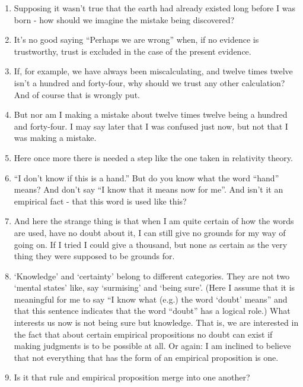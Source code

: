 \documentclass{book}
\begin{document}
\begin{enumerate}
\item
Supposing it wasn't true that the earth had already existed long before I was
born - how should we imagine the mistake being discovered?

\item
It's no good saying ``Perhaps we are wrong'' when, if no evidence is
trustworthy, trust is excluded in the case of the present evidence.

\item
If, for example, we have always been miscalculating, and twelve times twelve
isn't a hundred and forty-four, why should we trust any other calculation? And
of course that is wrongly put.

\item
But nor am I making a mistake about twelve times twelve being a hundred and
forty-four. I may say later that I was confused just now, but not that I was
making a mistake.

\item
Here once more there is needed a step like the one taken in relativity theory.

\item
``I don't know if this is a hand.'' But do you know what the word ``hand''
means? And don't say ``I know that it means now for me''. And isn't it an
empirical fact - that this word is used like this?

\item
And here the strange thing is that when I am quite certain of how the words are
used, have no doubt about it, I can still give no grounds for my way of going
on. If I tried I could give a thousand, but none as certain as the very thing
they were supposed to be grounds for.

\item
`Knowledge' and `certainty' belong to different categories. They are not two
`mental states' like, say `surmising' and `being sure'. (Here I assume that it
is meaningful for me to say ``I know what (e.g.) the word `doubt' means'' and
that this sentence indicates that the word ``doubt'' has a logical role.) What
interests us now is not being sure but knowledge. That is, we are interested in
the fact that about certain empirical propositions no doubt can exist if making
judgments is to be possible at all. Or again: I am inclined to believe that not
everything that has the form of an empirical proposition is one.

\item
Is it that rule and empirical proposition merge into one another?


\end{enumerate}
\end{document}
